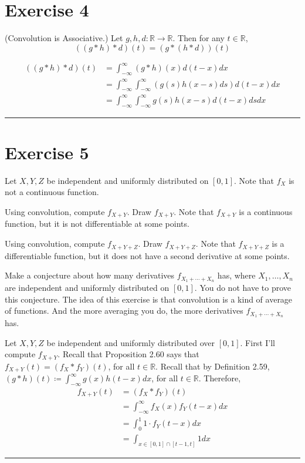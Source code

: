 \documentclass{article}
\theoremstyle{break}
\newenvironment{solution}{{\bf Solution:}}{\hfill\rule{2mm}{2mm}}
\renewenvironment{proof}{{\bf Proof:}}{\hfill\rule{2mm}{2mm}}
\newcommand{\R}{\mathbb{R}}
\begin{document}
\section*{Exercise 4}
(Convolution is Associative.)
Let $g,h,d\colon\R\to\R$.  Then for any $t\in\R$,
$$((g*h)*d)(t)=(g*(h*d))(t)$$


\begin{proof}

\begin{align*}
((g \ast h) \ast d)(t)&= \int_{-\infty}^\infty (g \ast h)(x) d(t-x) dx \\
	&= \int_{-\infty}^\infty \int_{-\infty}^\infty (g(s) h(x-s) ds ) d(t-x) dx \\
	&= \int_{-\infty}^\infty \int_{-\infty}^\infty g(s) h(x-s) d(t-x) ds dx
\end{align*}

\end{proof}

\section*{Exercise 5}
Let $X,Y,Z$ be independent and uniformly distributed on $[0,1]$.  Note that $f_{X}$ is not a continuous function.

Using convolution, compute $f_{X+Y}$.  Draw $f_{X+Y}$.  Note that $f_{X+Y}$ is a continuous function, but it is not differentiable at some points.

Using convolution, compute $f_{X+Y+Z}$.  Draw $f_{X+Y+Z}$.  Note that $f_{X+Y+Z}$ is a differentiable function, but it does not have a second derivative at some points.

Make a conjecture about how many derivatives $f_{X_{1}+\cdots+X_{n}}$ has, where $X_{1},\ldots,X_{n}$ are independent and uniformly distributed on $[0,1]$.  You do not have to prove this conjecture.  The idea of this exercise is that convolution is a kind of average of functions.  And the more averaging you do, the more derivatives $f_{X_{1}+\cdots+X_{n}}$ has.

\begin{solution}
Let $X,Y,Z$ be independent and uniformly distributed over $[0,1]$. First I'll compute $f_{X+Y}$. Recall that Proposition 2.60 says that $f_{X+Y}(t) = (f_X \ast f_Y)(t)$, for all $t \in \R$. Recall that by Definition 2.59, $(g \ast h)(t) \coloneqq \int_{-\infty}^\infty g(x) h(t-x) dx$, for all $t \in \R$. Therefore,
\begin{align*}
f_{X+Y}(t) &= (f_X \ast f_Y)(t) \\
	&= \int_{-\infty}^\infty f_X(x) f_Y(t-x) dx \\
	&= \int_0^1 1 \cdot f_Y(t-x) dx \\
	&= \int_{x \in [0,1]\cap[t-1,t]} 1 dx
\end{align*}





\end{solution}
\end{document}
